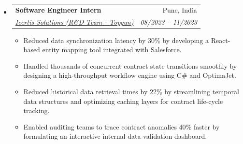 \documentclass[10pt,a4paper]{article}
\makeatletter
\newcommand{\resumeItem}[1]{\item\small{#1}}
\newcommand{\resumeSubheading}[4]{
  \vspace{-1pt}\item
    \begin{tabular*}{1.0\textwidth}[t]{l@{\extracolsep{\fill}}r}
      \textbf{#1} & #2 \\
      \textit{\small#3} & \textit{\small #4} \\
    \end{tabular*}\vspace{-5pt}
}
\makeatother
\begin{document}
\begin{itemize}[label={}]
    \resumeSubheading
      {Software Engineer Intern}{Pune, India}
      {\href{https://icertis.com}{Icertis Solutions (R\&D Team - Topgun)}}{08/2023 -- 11/2023}
      \begin{itemize}
        \resumeItem{Reduced data synchronization latency by 30\% by developing a React-based entity mapping tool integrated with Salesforce.}
        \resumeItem{Handled thousands of concurrent contract state transitions smoothly by designing a high-throughput workflow engine using C\# and OptimaJet.}
        \resumeItem{Reduced historical data retrieval times by 22\% by streamlining temporal data structures and optimizing caching layers for contract life-cycle tracking.}
        \resumeItem{Enabled auditing teams to trace contract anomalies 40\% faster by formulating an interactive internal data-validation dashboard.}
      \end{itemize}
\end{itemize}
\end{document}
